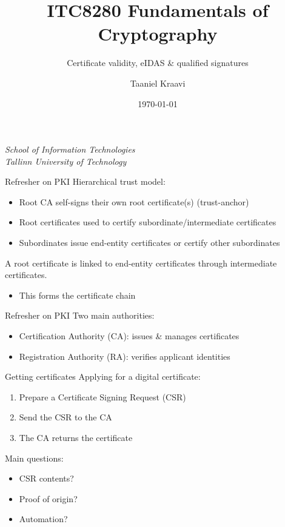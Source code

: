 \graphicspath{ {../../images/} }
\usetikzlibrary{external}
\usepackage{changepage}

\newlength{\offset}

\title{ITC8280 Fundamentals of Cryptography}
\subtitle{Certificate validity, eIDAS \& qualified signatures}
\date{\today}
\author{Taaniel Kraavi}
\institute%
{%
  \textit{School of Information Technologies}\\
  \textit{Tallinn University of Technology}
}


\begin{frame}
  \titlepage
\end{frame}

\begin{frame}{Refresher on PKI}
  Hierarchical trust model:
  \begin{itemize}[<+(1)->]
    \item Root CA self-signs their own root certificate(s) (trust-anchor)
    \item Root certificates used to certify subordinate/intermediate certificates
    \item Subordinates issue end-entity certificates or certify other subordinates
  \end{itemize}

  \vspace*{1em}

  \pause
  A root certificate is linked to end-entity certificates through intermediate certificates.
  \begin{itemize}[<+(1)->]
    \item This forms the certificate chain
  \end{itemize}
\end{frame}

\begin{frame}{Refresher on PKI}
  Two main authorities:
  \begin{itemize}[<+(1)->]
    \item Certification Authority (CA): issues \& manages certificates
    \item Registration Authority (RA): verifies applicant identities
  \end{itemize}
\end{frame}

\begin{frame}{Getting certificates}
  Applying for a digital certificate:
  \begin{enumerate}[<+(1)->]
    \item Prepare a Certificate Signing Request (CSR)
    \item Send the CSR to the CA
    \item The CA returns the certificate
  \end{enumerate}

  \vspace*{1em}

  \pause
  Main questions:
  \begin{itemize}
    \item CSR contents?
    \item Proof of origin?
    \item Automation?
  \end{itemize}
\end{frame}

